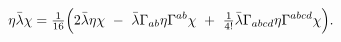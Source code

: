 \begin{equation}
\eta \bar{\lambda} \chi=
\tfrac{1}{16}\Bigl (2\bar{\lambda} \eta \chi
               \ -\ \bar{\lambda}\Gamma_{ab} \eta  \Gamma^{ab}\chi
               \ +\ \tfrac{1}{4!}\bar{\lambda} \Gamma_{abcd}\eta 
                    \Gamma^{abcd}\chi \Bigr).
\end{equation}

